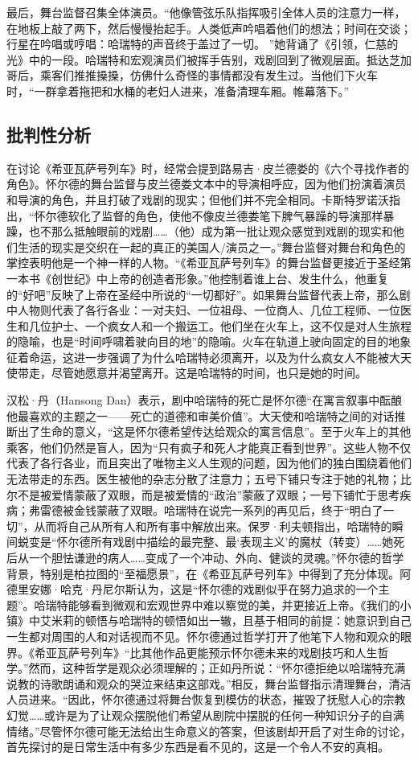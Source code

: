 \documentclass[lang=cn,newtx,10pt,scheme=chinese]{elegantbook}
\begin{document}
最后，舞台监督召集全体演员。“他像管弦乐队指挥吸引全体人员的注意力一样，在地板上敲了两下，然后慢慢抬起手。人类低声吟唱着他们的想法；时间在交谈；行星在吟唱或哼唱：哈瑞特的声音终于盖过了一切。 ”她背诵了《引领，仁慈的光》中的一段。哈瑞特和宏观演员们被挥手告别，戏剧回到了微观层面。抵达芝加哥后，乘客们推推搡搡，仿佛什么奇怪的事情都没有发生过。当他们下火车时，“一群拿着拖把和水桶的老妇人进来，准备清理车厢。帷幕落下。”

\subsection{批判性分析}

在讨论《希亚瓦萨号列车》时，经常会提到路易吉·皮兰德娄的《六个寻找作者的角色》。怀尔德的舞台监督与皮兰德娄文本中的导演相呼应，因为他们扮演着演员和导演的角色，并且打破了戏剧的现实；但他们并不完全相同。卡斯特罗诺沃指出，“怀尔德软化了监督的角色，使他不像皮兰德娄笔下脾气暴躁的导演那样暴躁，也不那么抵触眼前的戏剧……（他）成为第一批让观众感觉到戏剧的现实和他们生活的现实是交织在一起的真正的美国人/演员之一。”舞台监督对舞台和角色的掌控表明他是一个神一样的人物。“《希亚瓦萨号列车》的舞台监督更接近于圣经第一本书《创世纪》中上帝的创造者形象。”他控制着谁上台、发生什么，他重复的“好吧”反映了上帝在圣经中所说的“一切都好”。如果舞台监督代表上帝，那么剧中人物则代表了各行各业：一对夫妇、一位祖母、一位商人、几位工程师、一位医生和几位护士、一个疯女人和一个搬运工。他们坐在火车上，这不仅是对人生旅程的隐喻，也是“时间呼啸着驶向目的地”的隐喻。火车在轨道上驶向固定的目的地象征着命运，这进一步强调了为什么哈瑞特必须离开，以及为什么疯女人不能被大天使带走，尽管她愿意并渴望离开。这是哈瑞特的时间，也只是她的时间。

汉松·丹（Hansong Dan）表示，剧中哈瑞特的死亡是怀尔德“在寓言叙事中酝酿他最喜欢的主题之一——死亡的道德和审美价值”。大天使和哈瑞特之间的对话推断出了生命的意义，“这是怀尔德希望传达给观众的寓言信息”。至于火车上的其他乘客，他们仍然是盲人，因为“只有疯子和死人才能真正看到世界”。这些人物不仅代表了各行各业，而且突出了唯物主义人生观的问题，因为他们的独白围绕着他们无法带走的东西。医生被他的杂志分散了注意力；五号下铺只专注于她的礼物；比尔不是被爱情蒙蔽了双眼，而是被爱情的“政治”蒙蔽了双眼；一号下铺忙于思考疾病；弗雷德被金钱蒙蔽了双眼。哈瑞特在说完一系列的再见后，终于“明白了一切”，从而将自己从所有人和所有事中解放出来。保罗·利夫顿指出，哈瑞特的瞬间蜕变是“怀尔德所有戏剧中描绘的最完整、最‘表现主义’的魔杖（转变）……她死后从一个胆怯谦逊的病人……变成了一个冲动、外向、健谈的灵魂。”怀尔德的哲学背景，特别是柏拉图的“至福愿景”，在《希亚瓦萨号列车》中得到了充分体现。阿德里安娜·哈克·丹尼尔斯认为，这是“怀尔德的戏剧似乎在努力追求的一个主题”。哈瑞特能够看到微观和宏观世界中难以察觉的美，并更接近上帝。《我们的小镇》中艾米莉的顿悟与哈瑞特的顿悟如出一辙，且基于相同的前提：她意识到自己一生都对周围的人和对话视而不见。怀尔德通过哲学打开了他笔下人物和观众的眼界。《希亚瓦萨号列车》“比其他作品更能预示怀尔德未来的戏剧技巧和人生哲学。”然而，这种哲学是观众必须理解的；正如丹所说：“怀尔德拒绝以哈瑞特充满说教的诗歌朗诵和观众的哭泣来结束这部戏。”相反，舞台监督指示清理舞台，清洁人员进来。“因此，怀尔德通过将舞台恢复到模仿的状态，摧毁了抚慰人心的宗教幻觉……或许是为了让观众摆脱他们希望从剧院中摆脱的任何一种知识分子的自满情绪。”尽管怀尔德可能无法给出生命意义的答案，但该剧却开启了对生命的讨论，首先探讨的是日常生活中有多少东西是看不见的，这是一个令人不安的真相。
\end{document}
